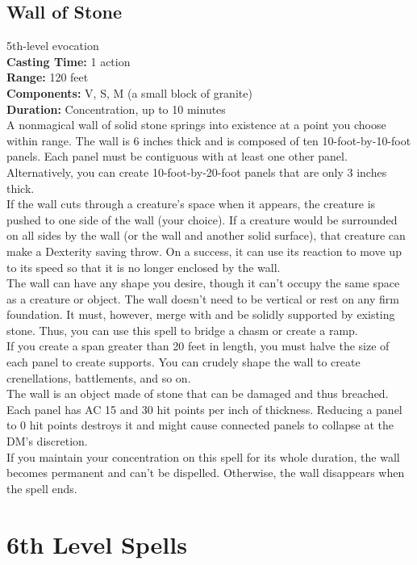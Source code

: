 \documentclass[11pt, A4paper, english]{article}
\begin{document}
		\subsection{Wall of Stone}
5th-level evocation \\
\textbf{Casting Time:} 1 action \\
\textbf{Range:} 120 feet \\
\textbf{Components:} V, S, M (a small block of granite) \\
\textbf{Duration:} Concentration, up to 10 minutes \\
A nonmagical wall of solid stone springs into existence at a point you choose within range. The wall is 6 inches thick and is composed of ten 10-foot-by-10-foot panels. Each panel must be contiguous with at least one other panel. Alternatively, you can create 10-foot-by-20-foot panels that are only 3 inches thick. \\
If the wall cuts through a creature’s space when it appears, the creature is pushed to one side of the wall (your choice). If a creature would be surrounded on all sides by the wall (or the wall and another solid surface), that creature can make a Dexterity saving throw. On a success, it can use its reaction to move up to its speed so that it is no longer enclosed by the wall. \\
The wall can have any shape you desire, though it can't occupy the same space as a creature or object. The wall doesn't need to be vertical or rest on any firm foundation. It must, however, merge with and be solidly supported by existing stone. Thus, you can use this spell to bridge a chasm or create a ramp. \\
If you create a span greater than 20 feet in length, you must halve the size of each panel to create supports. You can crudely shape the wall to create crenellations, battlements, and so on. \\
The wall is an object made of stone that can be damaged and thus breached. Each panel has AC 15 and 30 hit points per inch of thickness. Reducing a panel to 0 hit points destroys it and might cause connected panels to collapse at the DM’s discretion. \\
If you maintain your concentration on this spell for its whole duration, the wall becomes permanent and can’t be dispelled. Otherwise, the wall disappears when the spell ends.


	\section{6th Level Spells}
\end{document}
